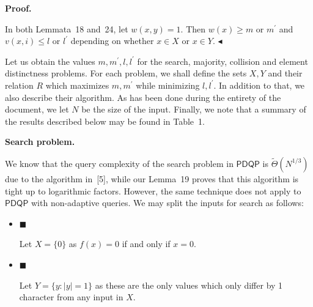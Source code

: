 \documentclass[10pt,a4paper]{article}
\begin{document}



\par\medskip\noindent\textbf{Proof.}\par




In both Lemmata 18 and 24, let $w(x,y)=1$. Then $w(x)\geq m$ or $m^{\prime}$ and $v(x,i)\leq l$ or $l^{\prime}$ depending on whether $x\in X$ or $x\in Y$.
$\blacktriangleleft$\par




Let us obtain the values $m,m^{\prime},l,l^{\prime}$ for the search, majority, collision and element distinctness problems. For each problem, we shall define the sets $X,Y$ and their relation $R$ which maximizes $m,m^{\prime}$ while minimizing $l,l^{\prime}$. In addition to that, we also describe their algorithm. As has been done during the entirety of the document, we let $N$ be the size of the input. Finally, we note that a summary of the results described below may be found in Table 1.\par





\par\medskip\noindent\textbf{Search problem.}\par




We know that the query complexity of the search problem in $\mathsf{PDQP}$ is $\tilde{\Theta}(N^{1/3})$ due to the algorithm in [5], while our Lemma 19 proves that this algorithm is tight up to logarithmic factors. However, the same technique does not apply to $\mathsf{PDQP}$ with non-adaptive queries. We may split the inputs for search as follows:\par


\begin{itemize}


\item[] 
$\blacksquare$ 


Let $X=\{0\}$ as $f(x)=0$ if and only if $x=0$.\par





\item[] 
$\blacksquare$ 


Let $Y=\{y:|y|=1\}$ as these are the only values which only differ by 1 character from any input in $X$.\par





\end{itemize}
\end{document}
